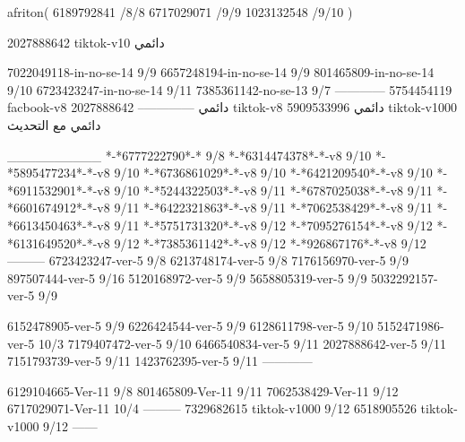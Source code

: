 afriton(
6189792841 /8/8
6717029071 /9/9
1023132548 /9/10
)

2027888642 tiktok-v10
دائمي

7022049118-in-no-se-14 9/9
6657248194-in-no-se-14 9/9
801465809-in-no-se-14 9/10
6723423247-in-no-se-14 9/11
7385361142-no-se-13
9/7
------------
5754454119 facbook-v8
دائمي
--------------
2027888642 tiktok-v8
دائمي
5909533996 tiktok-v1000
دائمي مع التحديث

__________
*-*6777222790*-* 9/8
*-*6314474378*-*-v8 9/10
*-*5895477234*-*-v8 9/10
*-*6736861029*-*-v8 9/10
*-*6421209540*-*-v8 9/10
*-*6911532901*-*-v8 9/10
*-*5244322503*-*-v8 9/11
*-*6787025038*-*-v8 9/11
*-*6601674912*-*-v8 9/11
*-*6422321863*-*-v8 9/11
*-*7062538429*-*-v8 9/11
*-*6613450463*-*-v8 9/11
*-*5751731320*-*-v8 9/12
*-*7095276154*-*-v8 9/12
*-*6131649520*-*-v8 9/12
*-*7385361142*-*-v8 9/12
*-*926867176*-*-v8 9/12
---------
6723423247-ver-5 9/8
6213748174-ver-5 9/8
7176156970-ver-5 9/9
897507444-ver-5 9/16
5120168972-ver-5 9/9
5658805319-ver-5 9/9
5032292157-ver-5 9/9

6152478905-ver-5 9/9
6226424544-ver-5 9/9
6128611798-ver-5 9/10
5152471986-ver-5 10/3
7179407472-ver-5 9/10
6466540834-ver-5 9/11
2027888642-ver-5 9/11
7151793739-ver-5 9/11
1423762395-ver-5 9/11
------------


6129104665-Ver-11
9/8
801465809-Ver-11
9/11
7062538429-Ver-11
9/12
6717029071-Ver-11
10/4
---------
7329682615 tiktok-v1000
9/12
6518905526 tiktok-v1000
9/12
------
